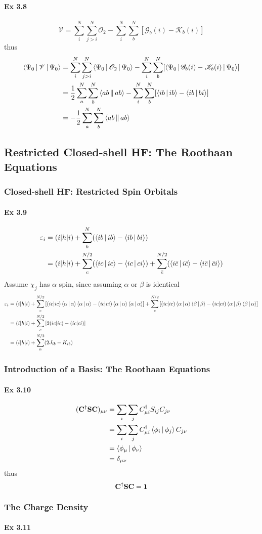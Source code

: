 \documentclass[a4paper]{article}
\newcommand{\iden}{{\large \bm{1}}}
\newcommand{\ex}[1]{\paragraph{Ex #1}}
\numberwithin{equation}{subsection}
\begin{document}
\ex{3.8}
\begin{equation}\label{key}
\mathscr{V} = \sum_i^N \sum_{j>i}^N \mathscr{O}_2 - \sum_i^N\sum_b^N [\mathscr{G}_b(i) - \mathscr{K}_b(i)]
\end{equation}
thus
\begin{align}
\Braket{\Psi_0 | \mathscr{V} | \Psi_0} &= \sum_i^N \sum_{j>i}^N \Braket{\Psi_0 | \mathscr{O}_2 | \Psi_0} - \sum_i^N\sum_b^N [\Braket{\Psi_0 | \mathscr{G}_b(i) - \mathscr{K}_b(i)| \Psi_0}] \notag\\
&= \dfrac{1}{2}\sum_a^N \sum_b^N \Braket{ab||ab} - \sum_i^N\sum_b^N [\Braket{ib|ib} - \Braket{ib|bi}] \notag\\
&= -\dfrac{1}{2}\sum_a^N \sum_b^N \Braket{ab||ab}
\end{align}

\subsection{Restricted Closed-shell HF: The Roothaan Equations}
\subsubsection{Closed-shell HF: Restricted Spin Orbitals}
\ex{3.9}
\begin{align}
\varepsilon_i %
&= (i|h|i) + \sum_b^N(\Braket{ib|ib} - \Braket{ib|bi}) \notag\\
&= (i|h|i) + \sum_c^{N/2}(\Braket{ic|ic} - \Braket{ic|ci}) + \sum_{\bar{c}}^{N/2}(\Braket{i\bar{c}|i\bar{c}} - \Braket{i\bar{c}|\bar{c}i}) 
\end{align}
Assume $ \chi_j $ has $ \alpha $ spin, since assuming $ \alpha $ or $ \beta $ is identical
\begin{align}
\varepsilon_i &= (i|h|i) + \sum_c^{N/2}\qty[ (ic|ic)\Braket{\alpha|\alpha}\Braket{\alpha|\alpha} 
- (ic|ci)\Braket{\alpha|\alpha}\Braket{\alpha|\alpha}]
+ \sum_c^{N/2}\qty[(ic|ic)\Braket{\alpha|\alpha}\Braket{\beta|\beta} 
- (ic|ci)\Braket{\alpha|\beta}\Braket{\beta|\alpha}] \notag\\
&= (i|h|i) + \sum_c^{N/2}\qty[ 2(ic|ic) - (ic|ci)] \notag\\
&= (i|h|i) + \sum_n^{N/2} (2J_{ib} - K_{ib})
\end{align}

\subsubsection{Introduction of a Basis: The Roothaan Equations}
\ex{3.10}
\begin{align}
(\vb{C}^\dagger \vb{S} \vb{C})_{\mu\nu} &= \sum_i\sum_j C^\dagger_{\mu i} S_{ij} C_{j\nu} \notag\\
&= \sum_i\sum_j C^\dagger_{\mu i} \Braket{\phi_i| \phi_j} C_{j\nu} \notag\\
&= \Braket{\phi_\mu | \phi_\nu} \notag\\
&= \delta_{\mu\nu}
\end{align}
thus
\begin{equation}\label{key}
\vb{C}^\dagger \vb{S} \vb{C} = \iden
\end{equation}

\subsubsection{The Charge Density}
\ex{3.11}
\end{document}
